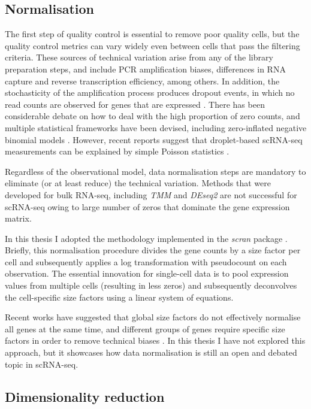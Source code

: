 \subsection{Normalisation}

The first step of quality control is essential to remove poor quality cells, but the quality control metrics can vary widely even between cells that pass the filtering criteria. These sources of technical variation arise from any of the library preparation steps, and include PCR amplification biases, differences in RNA capture and reverse transcription efficiency, among others. In addition, the stochasticity of the amplification process produces dropout events, in which no read counts are observed for genes that are expressed \cite{VandenBerge2018}. There has been considerable debate on how to deal with the high proportion of zero counts, and multiple statistical frameworks have been devised, including zero-inflated negative binomial models \cite{Risso2018}. However, recent reports suggest that droplet-based scRNA-seq measurements can be explained by simple Poisson statistics \cite{Svensson2020,Sarkar2020}.

Regardless of the observational model, data normalisation steps are mandatory to eliminate (or at least reduce) the technical variation. Methods that were developed for bulk RNA-seq, including \textit{TMM} \cite{Robinson2010} and \textit{DEseq2} \cite{Love2014} are not successful for scRNA-seq owing to large number of zeros that dominate the gene expression matrix.

In this thesis I adopted the methodology implemented in the \textit{scran} package \cite{Lun2016a}. Briefly, this normalisation procedure divides the gene counts by a size factor per cell and subsequently applies a log transformation with pseudocount on each observation. The essential innovation for single-cell data is to pool expression values from multiple cells (resulting in less zeros) and subsequently deconvolves the cell-specific size factors using a linear system of equations.

Recent works have suggested that global size factors do not effectively normalise all genes at the same time, and different groups of genes require specific size factors in order to remove technical biases \cite{Hafemeister2019}. In this thesis I have not explored this approach, but it showcases how data normalisation is still an open and debated topic in scRNA-seq.

\subsection{Dimensionality reduction}

